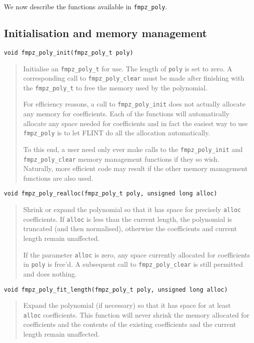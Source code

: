\documentclass[a4paper,10pt]{article}
\newcommand{\code}{\lstinline}
\begin{document}
We now describe the functions available in \code{fmpz_poly}.

\subsection{Initialisation and memory management}

\begin{lstlisting}
void fmpz_poly_init(fmpz_poly_t poly)
\end{lstlisting}
\begin{quote}
Initialise an \code{fmpz_poly_t} for use. The length of \code{poly} is set to zero. A corresponding call to \code{fmpz_poly_clear} must be made after finishing with the \code{fmpz_poly_t} to free the memory used by the polynomial.

For efficiency reasons, a call to \code{fmpz_poly_init} does not actually allocate any memory for coefficients. Each of the functions will automatically allocate any space needed for coefficients and in fact the easiest way to use \code{fmpz_poly} is to let FLINT do all the allocation automatically. 

To this end, a user need only ever make calls to the \code{fmpz_poly_init} and \code{fmpz_poly_clear} memory management functions if they so wish. Naturally, more efficient code may result if the other memory management functions are also used.
\end{quote}

\begin{lstlisting}
void fmpz_poly_realloc(fmpz_poly_t poly, unsigned long alloc)
\end{lstlisting}
\begin{quote}
Shrink or expand the polynomial so that it has space for precisely \code{alloc} coefficients. If \code{alloc} is less than the current length, the polynomial is truncated (and then normalised), otherwise the coefficients and current length remain unaffected. 

If the parameter \code{alloc} is zero, any space currently allocated for coefficients in \code{poly} is free'd. A subsequent call to \code{fmpz_poly_clear} is still permitted and does nothing.
\end{quote}

\begin{lstlisting}
void fmpz_poly_fit_length(fmpz_poly_t poly, unsigned long alloc)
\end{lstlisting}
\begin{quote}
Expand the polynomial (if necessary) so that it has space for at least \code{alloc} coefficients. This function will never shrink the memory allocated for coefficients and the contents of the existing coefficients and the current length remain unaffected. 
\end{quote}
\end{document}
